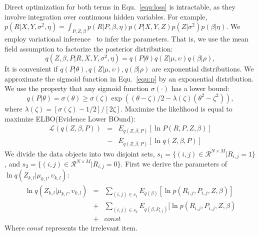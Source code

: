 \documentclass[conference]{IEEEtran}
\begin{document}
Direct optimization for both terms in Equ.~\ref{equ:loss} is intractable, as they involve integration over continuous hidden variables. For example, $p(R|X,Y,\sigma^2,\eta)=\int_{P,Z,\beta} p(R|P,\beta,\eta) p(P|X,Y,Z) p(Z|\sigma^2) p(\beta|\eta) $. We employ variational inference~\cite{Variational} to infer the parameters. That is, we use the mean field assumption to factorize the posterior distribution: 
\begin{equation}
    q(Z,\beta,P|R,X,Y,\sigma^{2},\eta) = q(P|\theta)q(Z|\mu,\upsilon)q(\beta|\rho),
\end{equation}
It is convenient if $q(P|\theta),q(Z|\mu,\upsilon),q(\beta|\rho)$ are exponential distributions. We approximate the sigmoid function in Equ.~\ref{equ:p} by an exponential distribution. We use the property that any sigmoid function $\sigma(\cdot)$ has a lower bound:
\begin{equation}
q(P|\theta)=\sigma(\theta)\geq \sigma(\zeta)\exp{((\theta-\zeta)/2-\lambda(\zeta)(\theta^2-\zeta^2))},
\end{equation}
where $\lambda(\zeta)=[\sigma(\zeta)-1/2]/[2\zeta]$.
Maximize the likelihood is equal to maximize ELBO(Evidence Lower BOund):
\begin{eqnarray}\label{elbo}
    \mathcal{L}(q(Z,\beta ,P)) &=& E_{q(Z,\beta ,P)}[\ln P(R,P,Z,\beta)] \nonumber \\ &-&E_{q(Z,\beta,P)}[\ln q(Z,\beta,P)]
\end{eqnarray}
We divide the data objects into two disjoint sets, $s_1 = \{(i,j)\in \mathcal{R}^{N\times M}|R_{i,j}=1\}$, and $s_2= \{(i,j)\in \mathcal{R}^{N\times M}|R_{i,j}=0\}$.
First we derive the parameters of $\ln{q(Z_{k,l}|\mu_{k,l},\upsilon_{k,l})}$:
\begin{eqnarray*}
    \ln q(Z_{k,l}|\mu_{k,l},\upsilon_{k,l}) 
    &=& \sum_{(i,j)\in s_1}E_{q(\beta)}[\ln p(R_{i,j},P_{i,j},Z,\beta)]  \\
    &+& \sum_{(i,j)\in s_2}E_{q(\beta,P_{i,j})}[\ln p(R_{i,j},P_{i,j},Z,\beta) \\
    &+& const
\end{eqnarray*}
Where $const$ represents the irrelevant item.
\end{document}
